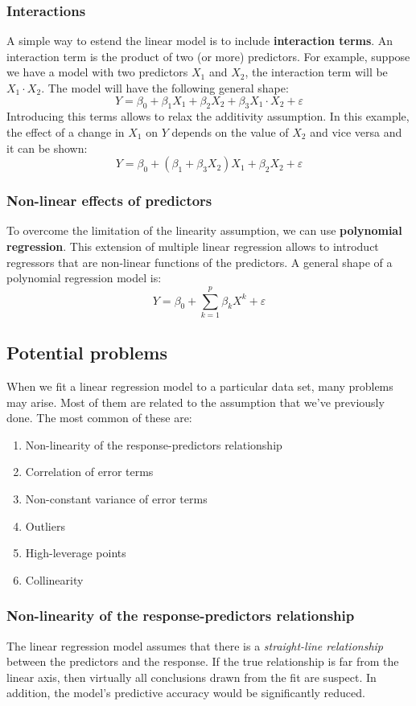 \subsubsection*{Interactions}
A simple way to estend the linear model is to include \textbf{interaction terms}. An interaction term is the product of two (or more) predictors.
For example, suppose we have a model with two predictors $X_1$ and $X_2$, the interaction term will be $X_1 \cdot X_2$. The model will have the following general shape:
\[
    Y = \beta_0 + \beta_1 X_1 + \beta_2 X_2 + \beta_3 X_1 \cdot X_2 + \varepsilon
\]
Introducing this terms allows to relax the additivity assumption. In this example, the effect of a change in $X_1$ on $Y$ depends on the value of $X_2$ and vice versa and it can be shown:
\[
    Y = \beta_0 + (\beta_1+\beta_3X_2)X_1 + \beta_2X_2 + \varepsilon
\]
\subsubsection*{Non-linear effects of predictors}
To overcome the limitation of the linearity assumption, we can use \textbf{polynomial regression}. This extension of multiple linear regression allows to introduct regressors that are non-linear functions of the predictors.
A general shape of a polynomial regression model is:
\[
    Y = \beta_0 + \sum_{k=1}^p \beta_kX^k + \varepsilon
\]

\subsection*{Potential problems}
When we fit a linear regression model to a particular data set, many problems may arise. Most of them are related to the assumption that we've previously done. The most common of these are:

\begin{enumerate}
    \item Non-linearity of the response-predictors relationship
    \item Correlation of error terms
    \item Non-constant variance of error terms
    \item Outliers
    \item High-leverage points
    \item Collinearity
\end{enumerate}

\subsubsection*{Non-linearity of the response-predictors relationship}
The linear regression model assumes that there is a \textit{straight-line relationship} between the predictors and the response. If the true relationship is far from the linear axis, then virtually all conclusions drawn from the fit are suspect. In addition, the model's predictive accuracy would be significantly reduced.

